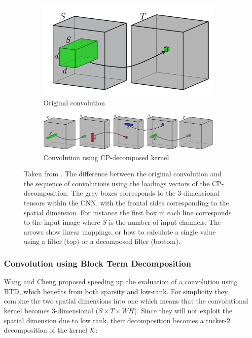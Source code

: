 \begin{figure}
    \centering
    \begin{subfigure}{\linewidth}
        \centering
        \includegraphics[width=0.4\linewidth]{Pics/03_Previous_work/fullConv.png}
        \caption{Original convolution}
    \end{subfigure}
    \begin{subfigure}{\linewidth}
        \centering
        \includegraphics[width=\linewidth]{Pics/03_Previous_work/decompConv.png}
        \caption{Convolution using CP-decomposed kernel}
    \end{subfigure}
    \caption{Taken from \cite{Lebedev2015}. The difference between the original convolution and the sequence of convolutions using the loadings vectors of the CP-decomposition. The grey boxes corresponds to the 3-dimensional tensors within the CNN, with the frontal sides corresponding to the spatial dimension. For instance the first box in each line corresponds to the input image where $S$ is the number of input channels. The arrows show linear mappings, or how to calculate a single value using a filter (top) or a decomposed filter (bottom).}
    \label{fig:decompConvDifference}
\end{figure}

\subsubsection{Convolution using Block Term Decomposition}
Wang and Cheng proposed speeding up the evaluation of a convolution using BTD, which benefits from both sparsity and low-rank. For simplicity they combine the two spatial dimensions into one which means that the convolutional kernel becomes 3-dimensional ($S\times T \times WH$). Since they will not exploit the spatial dimension due to low rank, their decomposition becomes a tucker-2 decomposition of the kernel $\mathcal{K}$:

